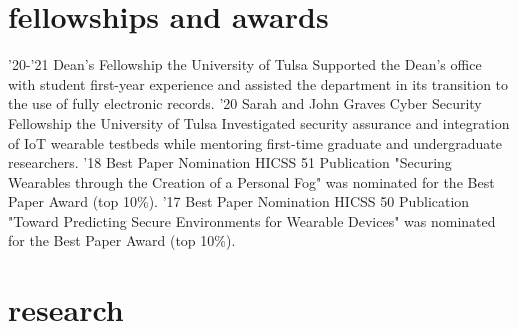 \documentclass[print]{friggeri-cv}
\begin{document}
  \section{fellowships and awards}

    \begin{entrylist}
      \entry
        {'20-'21}
        {Dean's Fellowship}
        {the University of Tulsa}
        {Supported the Dean's office with student first-year experience and assisted the department in its transition to the use of fully electronic records.}
      \entry
        {'20}
        {Sarah and John Graves Cyber Security Fellowship}
        {the University of Tulsa}
        {Investigated security assurance and integration of IoT wearable testbeds while mentoring first-time graduate and undergraduate researchers.}
      \entry
        {'18}
        {Best Paper Nomination}
        {HICSS 51}
        {Publication "Securing Wearables through the Creation of a Personal Fog" was nominated for the Best Paper Award (top 10\%).}
      \entry
        {'17}
        {Best Paper Nomination}
        {HICSS 50}
        {Publication "Toward Predicting Secure Environments for Wearable Devices" was nominated for the Best Paper Award (top 10\%).}
    \end{entrylist}

  \section{research}
\end{document}
